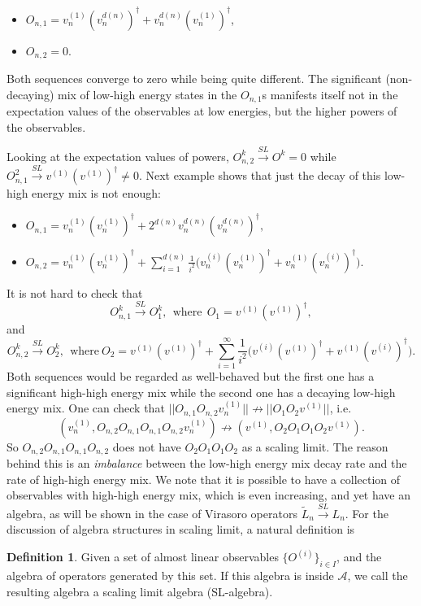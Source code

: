 \documentclass[twoside,11pt,titlepage]{amsart}
\renewcommand{\=}[1]{\stackrel{#1}{=}} %
\theoremstyle{definition}
\newtheorem{dfn}{Definition}
\theoremstyle{remark}
\begin{document}
\begin{itemize}
    \item $O_{n,1}=v_n^{(1)}(v^{d(n)}_n)^{\dagger}+v^{d(n)}_n(v_n^{(1)})^{\dagger}$,
    \item $O_{n,2}=0$.
\end{itemize} 

Both sequences converge to zero while being quite different. The significant (non-decaying) mix of low-high energy states in the $O_{n,1}$s  manifests itself not in the expectation values of the observables at low energies, but the higher powers of the observables. 

Looking at the expectation values of powers, $O_{n,2}^k \xrightarrow{SL} O^k=0$ while  $O_{n,1}^2 \xrightarrow{SL} v^{(1)}(v^{(1)})^{\dagger} \neq 0$. Next example shows that just the decay of this low-high energy mix is not enough:
\begin{itemize}
    \item $O_{n,1}=v_n^{(1)}(v_n^{(1)})^{\dagger}+2^{d(n)}v^{d(n)}_n(v^{d(n)}_n)^{\dagger},$
    \item $O_{n,2}=v_n^{(1)}(v_n^{(1)})^{\dagger}+ \sum_{i=1}^{d(n)}\frac{1}{i^2}\Big(  v_n^{(i)}(v_n^{(1)})^{\dagger}+v_n^{(1)}(v_n^{(i)})^{\dagger}\Big)$.
\end{itemize}
It is not hard to check that 
$$O_{n,1}^k \xrightarrow{SL} O_1^k, \ \ \text{where} \ \ O_1=v^{(1)}(v^{(1)})^{\dagger},$$ 
and
$$O_{n,2}^k \xrightarrow{SL} O_2^k, \ \ \text{where} \ O_2=v^{(1)}(v^{(1)})^{\dagger}+ \sum_{i=1}^{\infty}\frac{1}{i^2}\Big(  v^{(i)}(v^{(1)})^{\dagger}+v^{(1)}(v^{(i)})^{\dagger}\Big).$$
Both sequences would be regarded as well-behaved but the first one has a significant high-high energy mix while the second one has a decaying low-high energy mix. One can check that $||O_{n,1}O_{n,2}v_n^{(1)}|| \not \rightarrow ||O_1O_2 v^{(1)}||$, i.e.
$$(v_n^{(1)},O_{n,2}O_{n,1}O_{n,1}O_{n,2}v_n^{(1)}) \not \rightarrow (v^{(1)},O_2O_1O_1O_2v^{(1)}).$$
So $O_{n,2}O_{n,1}O_{n,1}O_{n,2}$ does not have $O_2O_1O_1O_2$ as a scaling limit. The reason behind this is an \textit{imbalance} between the low-high energy mix decay rate and the rate of high-high energy mix. We note that it is possible to have a collection of observables with high-high energy mix, which is even increasing, and yet have an algebra, as will be shown in the case of Virasoro operators $\widetilde{L}_n \xrightarrow{SL} L_n$. For the discussion of algebra structures in scaling limit, a natural definition is 
\begin{dfn} \label{dfn8}
Given a set of almost linear observables $\{O^{(i)}\}_{i \in I}$, and the algebra of operators generated by this set. If this algebra is inside $\mathcal{A}$, we call the resulting algebra a scaling limit algebra (SL-algebra).
\end{dfn}
\end{document}
